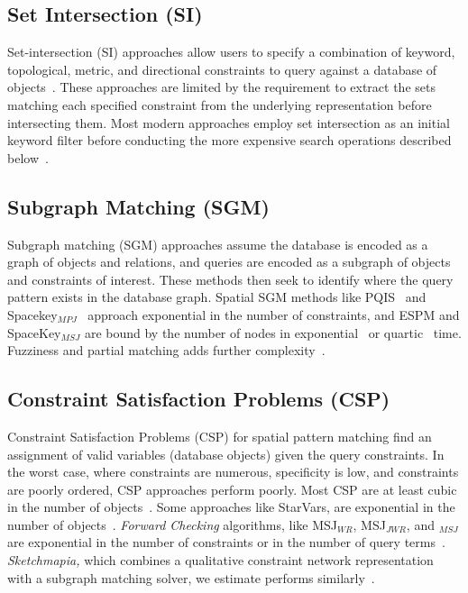 \subsection{Set Intersection (SI)}
\par{  
    Set-intersection (SI) approaches allow users to specify a combination of keyword, topological, metric, and directional constraints to query against a database of objects~\cite{DiLoreto1996, Soffer1996, Soffer1997, Soffer1998a, Soffer1999}.
    These approaches are limited by the requirement to extract the sets matching each specified constraint from the underlying representation before intersecting them. 
    Most modern approaches employ set intersection as an initial keyword filter before conducting the more expensive search operations described below~\cite{Schwering2014, Osul2023}.
    

\subsection{Subgraph Matching (SGM)}
\par{
    Subgraph matching (SGM) approaches assume the database is encoded as a graph of objects and relations, and queries are encoded as a subgraph of objects and constraints of interest.
    These methods then seek to identify where the query pattern exists in the database graph. 
    Spatial SGM methods like PQIS~\cite{Folkers2000} and Spacekey$_{MPJ}$~\cite{Fang2019} approach exponential in the number of constraints, and ESPM and SpaceKey$_{MSJ}$ are bound by the number of nodes in exponential~\cite{Chen2019} or quartic~\cite{Fang2019} time.
    Fuzziness and partial matching adds further complexity~\cite{Fang2019}.
    }
    
\subsection{Constraint Satisfaction Problems (CSP)}
    \par{
    Constraint Satisfaction Problems (CSP) for spatial pattern matching find an assignment of valid variables (database objects) given the query constraints.
    In the worst case, where constraints are numerous, specificity is low, and constraints are poorly ordered, CSP approaches perform poorly.
       Most CSP are at least cubic in the number of objects~\cite{Dylla2017}.
    Some approaches like StarVars, are exponential in the number of objects~\cite{Lee2013}.
    \textit{Forward Checking} algorithms, like MSJ$_{WR}$, MSJ$_{JWR}$, and $_{MSJ}$ are exponential in the number of constraints or in the number of query terms~\cite{Papadias1998}.
    \textit{Sketchmapia,} which combines a qualitative constraint network representation with a subgraph matching solver, we estimate performs similarly~\cite{Schwering2014, Jan2015}.
   

}}
